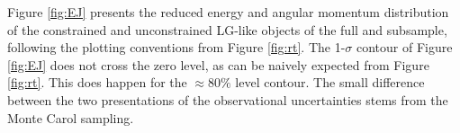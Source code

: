 \documentclass{emulateapj}
\begin{document}
Figure \ref{fig:EJ} presents the reduced  energy and angular momentum distribution of the constrained and unconstrained LG-like  objects of the full and subsample, following the   plotting conventions from Figure \ref{fig:rt}. 
The  1-$\sigma$ contour of Figure \ref{fig:EJ} does not cross the zero level, as can be naively expected from Figure \ref{fig:rt}. This does happen for the $\approx 80\%$ level contour. The small difference between the two presentations of the observational uncertainties stems from the Monte Carol sampling. 
\end{document}
